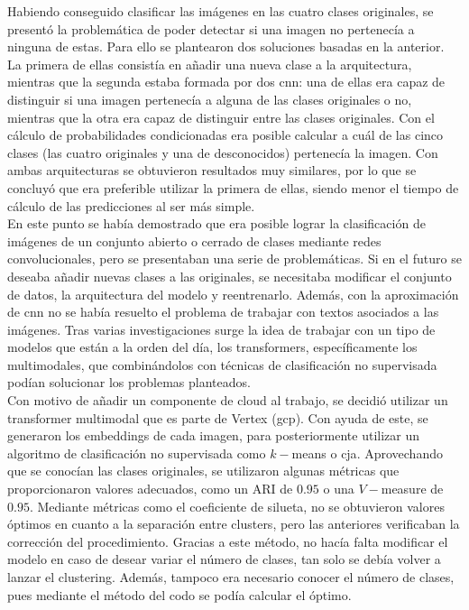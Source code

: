 	Habiendo conseguido clasificar las imágenes en las cuatro clases originales, se presentó la problemática de poder detectar si una imagen no pertenecía a ninguna de estas. Para ello se plantearon dos soluciones basadas en la anterior. La primera de ellas consistía en añadir una nueva clase a la arquitectura, mientras que la segunda estaba formada por dos \gls{cnn}: una de ellas era capaz de distinguir si una imagen pertenecía a alguna de las clases originales o no, mientras que la otra era capaz de distinguir entre las clases originales. Con el cálculo de probabilidades condicionadas era posible calcular a cuál de las cinco clases (las cuatro originales y una de desconocidos) pertenecía la imagen. Con ambas arquitecturas se obtuvieron resultados muy similares, por lo que se concluyó que era preferible utilizar la primera de ellas, siendo menor el tiempo de cálculo de las predicciones al ser más simple. \\
	
	En este punto se había demostrado que era posible lograr la clasificación de imágenes de un conjunto abierto o cerrado de clases mediante redes convolucionales, pero se presentaban una serie de problemáticas. Si en el futuro se deseaba añadir nuevas clases a las originales, se necesitaba modificar el conjunto de datos, la arquitectura del modelo y reentrenarlo. Además, con la aproximación de \gls{cnn} no se había resuelto el problema de trabajar con textos asociados a las imágenes. Tras varias investigaciones surge la idea de trabajar con un tipo de modelos que están a la orden del día, los transformers, específicamente los multimodales, que combinándolos con técnicas de clasificación no supervisada podían solucionar los problemas planteados. \\
	
	Con motivo de añadir un componente de cloud al trabajo, se decidió utilizar un transformer multimodal que es parte de Vertex (\gls{gcp}). Con ayuda de este, se generaron los embeddings de cada imagen, para posteriormente utilizar un algoritmo de clasificación no supervisada como $k-$means o \gls{cja}. Aprovechando que se conocían las clases originales, se utilizaron algunas métricas que proporcionaron valores adecuados, como un ARI de $0.95$ o una $V-$measure de $0.95$. Mediante métricas como el coeficiente de silueta, no se obtuvieron valores óptimos en cuanto a la separación entre clusters, pero las anteriores verificaban la corrección del procedimiento. Gracias a este método, no hacía falta modificar el modelo en caso de desear variar el número de clases, tan solo se debía volver a lanzar el clustering. Además, tampoco era necesario conocer el número de clases, pues mediante el método del codo se podía calcular el óptimo. \\
	
